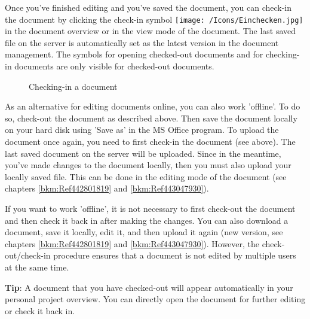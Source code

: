 Once you've finished editing and you've saved the document, you can check-in the document 
by clicking the check-in symbol \texttt{[image: /Icons/Einchecken.jpg]}  in the document overview or in the view mode of the document. The last saved file on the server is automatically set as the latest version in the document management. The symbols for opening checked-out documents and for checking-in documents are only visible for checked-out documents.

\begin{figure}[H]
\caption{Checking-in a document}
\end{figure}

As an alternative for editing documents online, you can also work 'offline'. To do so, check-out the document as described above. Then save the document locally on your hard disk using 'Save as' in the MS Office program. To upload the document once again, you need to first check-in the document (see above). 
The last saved document on the server will be uploaded. Since in the meantime, you've made changes to the document locally, then you must also upload your locally saved file. This can be done in the editing mode of the document (see chapters \ref{bkm:Ref442801819} and \ref{bkm:Ref443047930}). \newline

If you want to work 'offline', it is not necessary to first check-out the document and then check it back in after making the changes. You can also download a document, save it locally, edit it, and then upload it again (new version, see chapters \ref{bkm:Ref442801819} and \ref{bkm:Ref443047930}). However, the check-out/check-in procedure ensures that a document is not edited by multiple users at the same time.

\vspace{\baselineskip}

\textbf{Tip}: A document that you have checked-out will appear automatically in your personal project overview. You can directly open the document for further editing or check it back in. \newline


